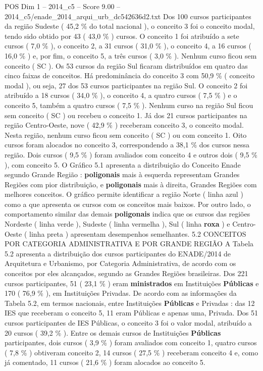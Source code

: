\begin{textsample}{POS Dim 1 – 2014\_c5 – Score 9.00 – 2014\_c5/enade\_2014\_arqui\_urb\_dc542636d2.txt}
Dos 100 cursos participantes da região Sudeste ( 45,2 \% do total nacional ), o conceito 3 foi o conceito modal, tendo sido obtido por 43 ( 43,0 \% ) cursos.
O conceito 1 foi atribuído a sete cursos ( 7,0 \% ), o conceito 2, a 31 cursos ( 31,0 \% ), o conceito 4, a 16 cursos ( 16,0 \% ) e, por fim, o conceito 5, a três cursos ( 3,0 \% ).
Nenhum curso ficou sem conceito ( SC ).
Os 53 cursos da região Sul ficaram distribuídos em quatro das cinco faixas de conceitos.
Há predominância do conceito 3 com 50,9 \% ( conceito modal ), ou seja, 27 dos 53 cursos participantes na região Sul.
O conceito 2 foi atribuído a 18 cursos ( 34,0 \% ), o conceito 4, a quatro cursos ( 7,5 \% ) e o conceito 5, também a quatro cursos ( 7,5 \% ).
Nenhum curso na região Sul ficou sem conceito ( SC ) ou recebeu o conceito 1.
Já dos 21 cursos participantes na região Centro-Oeste, nove ( 42,9 \% ) receberam conceito 3, o conceito modal.
Nesta região, nenhum curso ficou sem conceito ( SC ) ou com conceito 1.
Oito cursos foram alocados no conceito 3, correspondendo a 38,1 \% dos cursos nessa região.
Dois cursos ( 9,5 \% ) foram avaliados com conceito 4 e outros dois ( 9,5 \% ), com conceito 5.
O Gráfico 5.1 apresenta a distribuição do Conceito Enade segundo Grande Região : \textbf{poligonais} mais à esquerda representam Grandes Regiões com pior distribuição, e \textbf{poligonais} mais à direita, Grandes Regiões com melhores conceitos.
O gráfico permite identificar a região Norte ( linha azul ) como a que apresenta os cursos com os conceitos mais baixos.
Por outro lado, o comportamento similar das demais \textbf{poligonais} indica que os cursos das regiões Nordeste ( linha verde ), Sudeste ( linha vermelha ), Sul ( linha \textbf{roxa} ) e Centro-Oeste ( linha preta ) apresentam desempenhos semelhantes. 5.2 CONCEITOS POR CATEGORIA ADMINISTRATIVA E POR GRANDE REGIÃO A Tabela 5.2 apresenta a distribuição dos cursos participantes do ENADE/2014 de Arquitetura e Urbanismo, por Categoria Administrativa, de acordo com os conceitos por eles alcançados, segundo as Grandes Regiões brasileiras.
Dos 221 cursos participantes, 51 ( 23,1 \% ) eram \textbf{ministrados} em Instituições \textbf{Públicas} e 170 ( 76,9 \% ), em Instituições Privadas.
De acordo com as informações da Tabela 5.2, em termos nacionais, entre Instituições \textbf{Públicas} e Privadas : das 12 IES que receberam o conceito 5, 11 eram Públicas e apenas uma, Privada.
Dos 51 cursos participantes de IES Públicas, o conceito 3 foi o valor modal, atribuído a 20 cursos ( 39,2 \% ).
Entre os demais cursos de Instituições \textbf{Públicas} participantes, dois cursos ( 3,9 \% ) foram avaliados com conceito 1, quatro cursos ( 7,8 \% ) obtiveram conceito 2, 14 cursos ( 27,5 \% ) receberam conceito 4 e, como já comentado, 11 cursos ( 21,6 \% ) foram alocados ao conceito 5.

\end{textsample}
